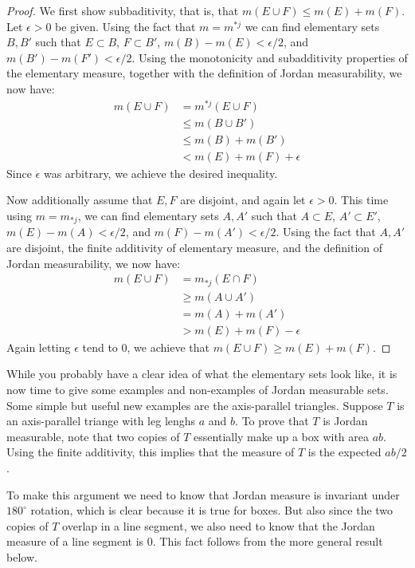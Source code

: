 \documentclass[11pt,oneside]{amsbook}
\theoremstyle{definition}
\theoremstyle{plain}
\theoremstyle{definition}
\theoremstyle{remark}
\numberwithin{equation}{section}
\numberwithin{figure}{section}
\begin{document}
\begin{proof}
  We first show subbaditivity, that is, that $m(E\cup F)\leq m(E)+m(F)$. Let $\epsilon>0$ be given. Using the fact that $m=m^{*j}$ we can find elementary sets $B,B'$ such that $E\subset B$, $F\subset B'$, $m(B)-m(E)<\epsilon/2$, and $m(B')-m(F')<\epsilon/2$. Using the monotonicity and subadditivity properties of the elementary measure, together with the definition of Jordan measurability, we now have:
  \begin{align*}
    m(E\cup F)&=m^{*j}(E\cup F)\\
              &\leq m(B\cup B')\\
              &\leq m(B)+m(B')\\
              &< m(E)+m(F)+\epsilon
  \end{align*}
  Since $\epsilon$ was arbitrary, we achieve the desired inequality.
  
  Now additionally assume that $E,F$ are disjoint, and again let $\epsilon>0$. This time using $m=m_{*j}$, we can find elementary sets $A,A'$ such that $A\subset E$, $A'\subset E'$, $m(E)-m(A)<\epsilon/2$, and $m(F)-m(A')<\epsilon/2$. Using the fact that $A,A'$ are disjoint, the finite additivity of elementary measure, and the definition of Jordan measurability, we now have:
  \begin{align*}
    m(E\cup F)&=m_{*j}(E\cap F)\\
              &\geq m(A\cup A')\\
              &=m(A)+m(A')\\
              &>m(E)+m(F)-\epsilon
  \end{align*}
  Again letting $\epsilon$ tend to $0$, we achieve that $m(E\cup F)\geq m(E)+m(F)$.
\end{proof}

While you probably have a clear idea of what the elementary sets look like, it is now time to give some examples and non-examples of Jordan measurable sets. Some simple but useful new examples are the axis-parallel triangles. Suppose $T$ is an axis-parallel triange with leg lenghs $a$ and $b$. To prove that $T$ is Jordan measurable, note that two copies of $T$ essentially make up a box with area $ab$. Using the finite additivity, this implies that the measure of $T$ is the expected $ab/2$.

To make this argument we need to know that Jordan measure is invariant under $180^\circ$ rotation, which is clear because it is true for boxes. But also since the two copies of $T$ overlap in a line segment, we also need to know that the Jordan measure of a line segment is $0$. This fact follows from the more general result below.
\end{document}
